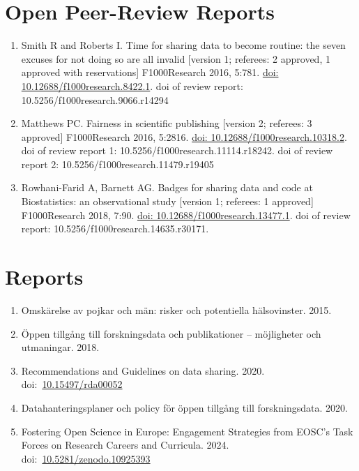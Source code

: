 \documentclass[10pt,a4paper,twocolumn]{article}
\begin{document}
\section{Open Peer-Review Reports}
\begin{enumerate}

    \item Smith R and Roberts I. Time for sharing data to become routine: the seven excuses for not doing so are all invalid [version 1; referees: 2 approved, 1 approved with reservations] F1000Research 2016, 5:781. \href{https://doi.org/10.12688/f1000research.8422.1}{doi: 10.12688/f1000research.8422.1}. doi of review report: 10.5256/f1000research.9066.r14294

    \item Matthews PC. Fairness in scientific publishing [version 2; referees: 3 approved] F1000Research 2016, 5:2816. \href{https://doi.org/10.12688/f1000research.10318.2}{doi: 10.12688/f1000research.10318.2}. doi of review report 1: 10.5256/f1000research.11114.r18242. doi of review report 2: 10.5256/f1000research.11479.r19405

    \item Rowhani-Farid A, Barnett AG. Badges for sharing data and code at Biostatistics: an observational study [version 1; referees: 1 approved] F1000Research 2018, 7:90. \href{https://doi.org/10.12688/f1000research.13477.1}{doi: 10.12688/f1000research.13477.1}. doi of review report: 10.5256/f1000research.14635.r30171.

\end{enumerate}



\section{Reports}
\begin{enumerate}

    \item Omskärelse av pojkar och män: risker och potentiella hälsovinster. 2015.

    \item Öppen tillgång till forskningsdata och publikationer – möjligheter och utmaningar. 2018.

    \item Recommendations and Guidelines on data sharing. 2020. doi:~\href{https://doi.org/10.15497/rda00052}{10.15497/rda00052}

    \item Datahanteringsplaner och policy för öppen tillgång till forskningsdata. 2020.

    \item Fostering Open Science in Europe: Engagement Strategies from EOSC's Task Forces on Research Careers and Curricula. 2024. doi:~\href{https://doi.org/10.5281/zenodo.10925393}{10.5281/zenodo.10925393}

\end{enumerate}
\end{document}
